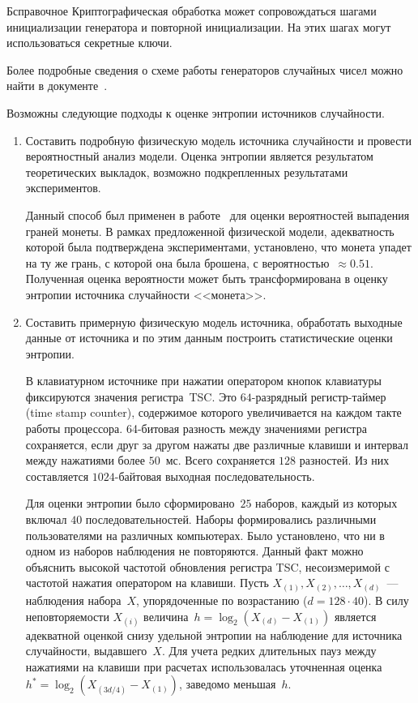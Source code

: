 \begin{appendix}{Б}{справочное}
Криптографическая обработка может сопровождаться шагами инициализации 
генератора и повторной инициализации. На этих шагах могут использоваться 
секретные ключи.

Более подробные сведения о схеме работы генераторов случайных чисел 
можно найти в документе~\cite{AIS31}.

\label{RNG.Entropy}

Возможны следующие подходы к оценке энтропии источников случайности.

\begin{enumerate}
\item 
Составить подробную физическую модель источника случайности и провести
вероятностный анализ модели. Оценка энтропии является результатом теоретических
выкладок, возможно подкрепленных результатами экспериментов.

\begin{example*}
Данный способ был применен в работе~\cite{DHM07} для оценки вероятностей
выпадения граней монеты. 
%
В рамках предложенной физической модели, адекватность
которой была подтверждена экспериментами, установлено, что монета упадет на
ту же грань, с которой она была брошена, с вероятностью~$\approx 0.51$.
%
Полученная оценка вероятности может быть трансформирована в оценку энтропии
источника случайности <<монета>>.
\end{example*}

\item 
Составить примерную физическую модель источника, обработать выходные данные от
источника и по этим данным построить статистические оценки энтропии.

\begin{example*}
В клавиатурном источнике при нажатии оператором кнопок клавиатуры 
фиксируются значения регистра~TSC. Это $64$-разрядный регистр-таймер (time 
stamp counter), содержимое которого увеличивается на каждом такте работы 
процессора.
%
%
64-битовая разность между значениями регистра сохраняется, если друг за другом 
нажаты две различные клавиши и интервал между нажатиями более $50$~мс. 
Всего сохраняется $128$ разностей. Из них составляется $1024$-байтовая 
выходная последовательность.

Для оценки энтропии было сформировано~$25$ наборов, 
каждый из которых включал $40$ последовательностей.
%
Наборы формировались различными пользователями на различных компьютерах. 
%
Было установлено, что ни в одном из наборов наблюдения не повторяются.
Данный факт можно объяснить высокой частотой обновления регистра TSC,
несоизмеримой с частотой нажатия оператором на клавиши.
%
Пусть $X_{(1)},X_{(2)},\ldots,X_{(d)}$~--- наблюдения набора~$X$, 
упорядоченные по возрастанию ($d=128\cdot 40$). 
%
В силу неповторяемости $X_{(i)}$ величина~$h=\log_2(X_{(d)}-X_{(1)})$
является адекватной оценкой снизу удельной энтропии на наблюдение для 
источника случайности, выдавшего~$X$.
%
Для учета редких длительных пауз между нажатиями на клавиши
при расчетах использовалась уточненная оценка $h^*=\log_2(X_{(3d/4)}-X_{(1)})$,
заведомо меньшая~$h$.


\end{example*}
\end{enumerate}
\end{appendix}
